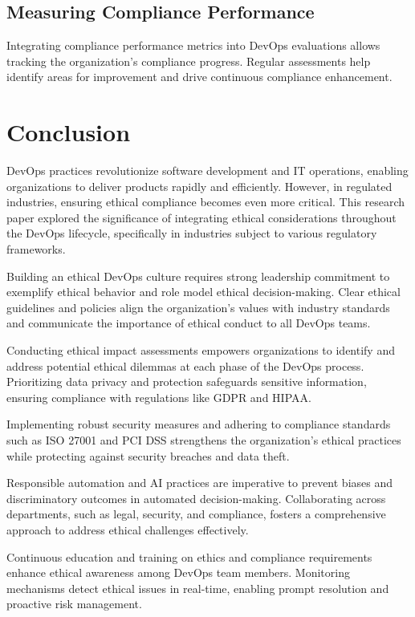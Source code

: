 \documentclass[conference]{IEEEtran}
\begin{document}
\subsection{Measuring Compliance Performance}
Integrating compliance performance metrics into DevOps evaluations allows tracking the organization's compliance progress. Regular assessments help identify areas for improvement and drive continuous compliance enhancement.

\section{Conclusion}
DevOps practices revolutionize software development and IT operations, enabling organizations to deliver products rapidly and efficiently. However, in regulated industries, ensuring ethical compliance becomes even more critical. This research paper explored the significance of integrating ethical considerations throughout the DevOps lifecycle, specifically in industries subject to various regulatory frameworks.

Building an ethical DevOps culture requires strong leadership commitment to exemplify ethical behavior and role model ethical decision-making. Clear ethical guidelines and policies align the organization's values with industry standards and communicate the importance of ethical conduct to all DevOps teams.

Conducting ethical impact assessments empowers organizations to identify and address potential ethical dilemmas at each phase of the DevOps process. Prioritizing data privacy and protection safeguards sensitive information, ensuring compliance with regulations like GDPR and HIPAA.

Implementing robust security measures and adhering to compliance standards such as ISO 27001 and PCI DSS strengthens the organization's ethical practices while protecting against security breaches and data theft.

Responsible automation and AI practices are imperative to prevent biases and discriminatory outcomes in automated decision-making. Collaborating across departments, such as legal, security, and compliance, fosters a comprehensive approach to address ethical challenges effectively.

Continuous education and training on ethics and compliance requirements enhance ethical awareness among DevOps team members. Monitoring mechanisms detect ethical issues in real-time, enabling prompt resolution and proactive risk management.
\end{document}
